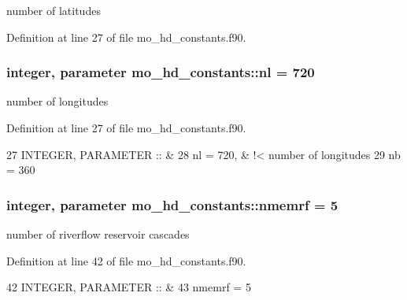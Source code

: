 number of latitudes 



Definition at line 27 of file mo\+\_\+hd\+\_\+constants.\+f90.

\hypertarget{namespacemo__hd__constants_a9be972e3a7c772eb94e17e1d538f418c}{}
\subsubsection[{nl}]{\setlength{\rightskip}{0pt plus 5cm}integer, parameter mo\+\_\+hd\+\_\+constants\+::nl = 720}\label{namespacemo__hd__constants_a9be972e3a7c772eb94e17e1d538f418c}


number of longitudes 



Definition at line 27 of file mo\+\_\+hd\+\_\+constants.\+f90.


\begin{DoxyCode}
27   \textcolor{keywordtype}{INTEGER},  \textcolor{keywordtype}{PARAMETER} :: &
28     nl = 720,                          & !< number of longitudes
29     nb = 360                             
\end{DoxyCode}
\hypertarget{namespacemo__hd__constants_a3f303b1ab15b9bc83ce3cca3beb1bfd0}{}
\subsubsection[{nmemrf}]{\setlength{\rightskip}{0pt plus 5cm}integer, parameter mo\+\_\+hd\+\_\+constants\+::nmemrf = 5}\label{namespacemo__hd__constants_a3f303b1ab15b9bc83ce3cca3beb1bfd0}


number of riverflow reservoir cascades 



Definition at line 42 of file mo\+\_\+hd\+\_\+constants.\+f90.


\begin{DoxyCode}
42   \textcolor{keywordtype}{INTEGER}, \textcolor{keywordtype}{PARAMETER}  :: &
43     nmemrf = 5
\end{DoxyCode}
